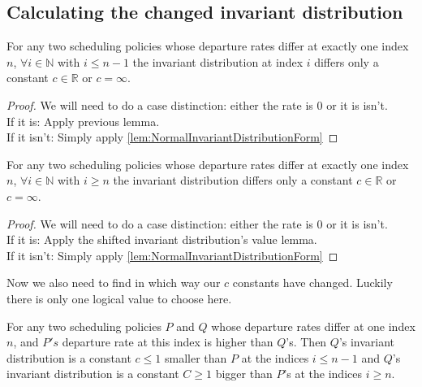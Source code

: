 \subsection{Calculating the changed invariant distribution}

\begin{lemma}\label{lem:BeforeCutScaled}
  For any two scheduling policies whose departure rates differ at exactly one index $n$, $\forall i \in \mathbb{N}$
  with $i \leq n - 1$ the invariant distribution at index $i$ differs only a constant $c \in \mathbb{R}$ or $c = \infty$.
\end{lemma}
\begin{proof}
  We will need to do a case distinction: either the rate is $0$ or it is isn't.\\
  If it is: Apply previous lemma.\\
  If it isn't: Simply apply \ref{lem:NormalInvariantDistributionForm}
\end{proof}

\begin{lemma}\label{lem:AfterCutScaled}
  For any two scheduling policies whose departure rates differ at exactly one index $n$, $\forall i \in \mathbb{N}$
  with $i \geq n$ the invariant distribution differs only a constant $c \in \mathbb{R}$ or $c = \infty$.
\end{lemma}

\begin{proof}
  We will need to do a case distinction: either the rate is $0$ or it is isn't.\\
  If it is: Apply the shifted invariant distribution's value lemma.\\
  If it isn't: Simply apply \ref{lem:NormalInvariantDistributionForm}
\end{proof}

Now we also need to find in which way our $c$ constants have changed. Luckily there is only
one logical value to choose here.
\begin{lemma}\label{lem:InvariantDistributionsSmaller}
  For any two scheduling policies $P$ and $Q$ whose departure rates differ at one index $n$,
  and $P's$ departure rate at this index is higher than $Q$'s. Then $Q$'s invariant distribution is
  a constant $c \leq 1$ smaller than $P$ at the indices $i \leq n - 1$ and $Q$'s invariant distribution is
  a constant $C \geq 1$ bigger than $P$'s at the indices $i \geq n$.
\end{lemma}

